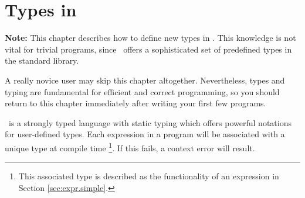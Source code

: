 \chapter{Types in \opal}
\label{chap:types}

{\bf Note:} This chapter describes how to define new types in \opal.
This knowledge is not vital for trivial programs, since \opal\ offers a
sophisticated set of predefined types in the standard library.

A really novice user may skip this chapter altogether. 
Nevertheless, types and typing are fundamental for efficient and correct
programming, so you should return to this chapter immediately after
writing your first few programs.
\bigskip


%

\advanced \opal\ is a strongly typed language with static typing which offers
powerful notations for user-defined types.
Each expression in a program will be associated with a unique type at
compile time%
\footnote{This associated type is described as the  functionality of
  an expression in
  Section \ref{sec:expr.simple}.}. 
If this fails, a context error will result.
\medskip

